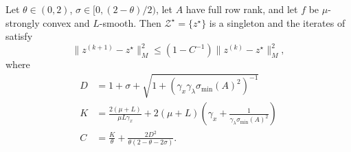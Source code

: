 \documentclass[11pt]{article}
\begin{document}
\begin{theorem}\label{thm:linear-convergence}
    Let $\theta \in (0,2)$, $\sigma \in [0, (2-\theta)/2)$, let $A$ have full row rank, and let $f$ be $\mu$-strongly convex and $L$-smooth.
    Then $\mathcal{Z}^\star = \{z^\star\}$ is a singleton and the iterates of  satisfy
    \begin{equation}\label{eq:linear-rate}
        \|z^{(k+1)} - z^\star\|_M^2 \leq \left(1 - C^{-1}\right)\|z^{(k)} - z^\star\|_M^2,
    \end{equation}
    where
    \begin{subequations}\label{eq:linear-rate-constants}
        \begin{align}
        D &= 1 + \sigma + \sqrt{1 + (\gamma_x\gamma_\lambda \sigma_{\min}(A)^2)^{-1}} \\
        K &= \frac{2(\mu + L)}{\mu L \gamma_x} + 2(\mu + L)\left(\gamma_x + \frac{1}{\gamma_\lambda \sigma_{\min}(A)^2}\right) \\
        C &= \frac{K}{\theta} + \frac{2D^2}{\theta(2-\theta-2\sigma)}.
        \end{align}
    \end{subequations}
\end{theorem}
\end{document}
